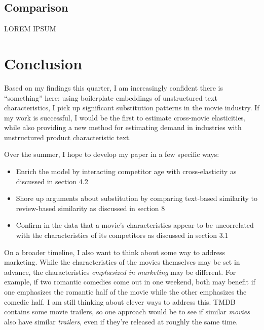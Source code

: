 \documentclass{article}
\begin{document}
\subsection{Comparison}

LOREM IPSUM


\section{Conclusion}

Based on my findings this quarter, I am increasingly confident there is ``something'' here: using boilerplate embeddings of unstructured text characteristics, I pick up significant substitution patterns in the movie industry. If my work is successful, I would be the first to estimate cross-movie elasticities, while also providing a new method for estimating demand in industries with unstructured product characteristic text.

Over the summer, I hope to develop my paper in a few specific ways:
\begin{itemize}
    \item Enrich the model by interacting competitor age with cross-elasticity as discussed in section 4.2
    \item Shore up arguments about substitution by comparing text-based similarity to review-based similarity as discussed in section 8
    \item Confirm in the data that a movie's characteristics appear to be uncorrelated with the characteristics of its competitors as discussed in section 3.1
\end{itemize}

On a broader timeline, I also want to think about some way to address marketing. While the characteristics of the movies themselves may be set in advance, the characteristics \emph{emphasized in marketing} may be different. For example, if two romantic comedies come out in one weekend, both may benefit if one emphasizes the romantic half of the movie while the other emphasizes the comedic half. I am still thinking about clever ways to address this. TMDB contains some movie trailers, so one approach would be to see if similar \emph{movies} also have similar \emph{trailers}, even if they're released at roughly the same time. 

\printbibliography
\end{document}
